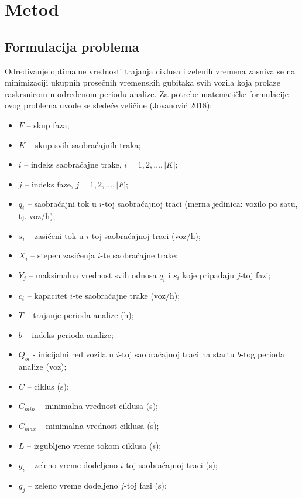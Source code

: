 \section{Metod}

\subsection{Formulacija problema}

Određivanje optimalne vrednosti trajanja ciklusa i zelenih vremena zasniva se na minimizaciji ukupnih prosečnih vremenskih gubitaka svih vozila koja prolaze raskrsnicom u određenom periodu analize. Za potrebe matematičke formulacije ovog problema uvode se sledeće veličine (Jovanović 2018):

\begin{itemize}
    \item $F$ -- skup faza;
    \item $K$ -- skup svih saobraćajnih traka;
    \item $i$ -- indeks saobraćajne trake, $i = 1, 2, \dots, |K|$;
    \item $j$ -- indeks faze, $j = 1, 2, \dots, |F|$;
    \item $q_i$ -- saobraćajni tok u $i$-toj saobraćajnoj traci (merna jedinica: vozilo po satu, tj. voz/h);
    \item $s_i$ -- zasićeni tok u $i$-toj saobraćajnoj traci (voz/h);
    \item $X_i$ -- stepen zasićenja $i$-te saobraćajne trake;
    \item $Y_j$ -- maksimalna vrednost svih odnosa $q_i$ i $s_i$ koje pripadaju $j$-toj fazi;
    \item $c_i$ -- kapacitet $i$-te saobraćajne trake (voz/h);
    \item $T$ -- trajanje perioda analize (h);
    \item $b$ -- indeks perioda analize;
    \item $Q_{bi}$ - inicijalni red vozila u $i$-toj saobraćajnoj traci na startu $b$-tog perioda analize (voz);
    \item $C$ -- ciklus (s);
    \item $C_{min}$ -- minimalna vrednost ciklusa (s);
    \item $C_{max}$ -- minimalna vrednost ciklusa (s);
    \item $L$ -- izgubljeno vreme tokom ciklusa (s);
    \item $g_i$ -- zeleno vreme dodeljeno $i$-toj saobraćajnoj traci (s);
    \item $g_j$ -- zeleno vreme dodeljeno $j$-toj fazi (s);

\end{itemize}
